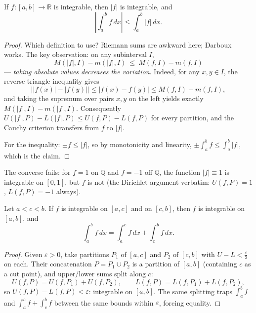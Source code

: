 \documentclass[11pt]{report}
\begin{document}
\begin{thmbox}
If $f: [a,b] \to \mathbb{R}$ is integrable, then $|f|$ is integrable, and
\[
\left| \int_a^b f\,dx \right| \leq \int_a^b |f|\,dx.
\]
\end{thmbox}

\begin{proof}
Which definition to use? Riemann sums are awkward here; Darboux works. The key observation: on any subinterval $I$,
\[
M(|f|, I) - m(|f|, I) \ \leq\ M(f, I) - m(f, I)
\]
--- \emph{taking absolute values decreases the variation}. Indeed, for any $x, y \in I$, the reverse triangle inequality gives
\[
\bigl| |f(x)| - |f(y)| \bigr| \leq |f(x) - f(y)| \leq M(f,I) - m(f,I),
\]
and taking the supremum over pairs $x, y$ on the left yields exactly $M(|f|,I) - m(|f|,I)$. Consequently $U(|f|,P) - L(|f|,P) \leq U(f,P) - L(f,P)$ for every partition, and the Cauchy criterion transfers from $f$ to $|f|$.

For the inequality: $\pm f \leq |f|$, so by monotonicity and linearity, $\pm \int_a^b f \leq \int_a^b |f|$, which is the claim.
\end{proof}

\begin{rembox}[Warning]
The converse fails: for $f = 1$ on $\mathbb{Q}$ and $f = -1$ off $\mathbb{Q}$, the function $|f| \equiv 1$ is integrable on $[0,1]$, but $f$ is not (the Dirichlet argument verbatim: $U(f,P) = 1$, $L(f,P) = -1$ always).
\end{rembox}

\begin{thmbox}
Let $a < c < b$. If $f$ is integrable on $[a,c]$ and on $[c,b]$, then $f$ is integrable on $[a,b]$, and
\[
\int_a^b f\,dx = \int_a^c f\,dx + \int_c^b f\,dx.
\]
\end{thmbox}

\begin{proof}
Given $\varepsilon > 0$, take partitions $P_1$ of $[a,c]$ and $P_2$ of $[c,b]$ with $U - L < \tfrac\varepsilon2$ on each. Their concatenation $P = P_1 \cup P_2$ is a partition of $[a,b]$ (containing $c$ as a cut point), and upper/lower sums split along $c$:
\[
U(f, P) = U(f, P_1) + U(f, P_2), \qquad L(f,P) = L(f,P_1) + L(f,P_2),
\]
so $U(f,P) - L(f,P) < \varepsilon$: integrable on $[a,b]$. The same splitting traps $\int_a^b f$ and $\int_a^c f + \int_c^b f$ between the same bounds within $\varepsilon$, forcing equality.
\end{proof}
\end{document}
